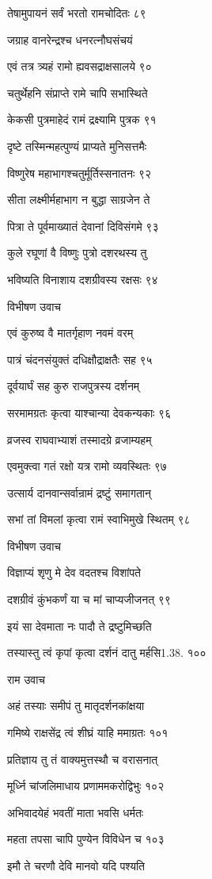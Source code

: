 तेषामुपायनं सर्वं भरतो रामचोदितः ८९

जग्राह वानरेन्द्रश्च धनरत्नौघसंचयं

एवं तत्र त्र्यहं रामो ह्यवसद्राक्षसालये ९०

चतुर्थेहनि संप्राप्ते रामे चापि सभास्थिते

केकसी पुत्रमाहेदं रामं द्रक्ष्यामि पुत्रक ९१

दृष्टे तस्मिन्महत्पुण्यं प्राप्यते मुनिसत्तमैः

विष्णुरेष महाभागश्चतुर्मूर्तिस्सनातनः ९२

सीता लक्ष्मीर्महाभाग न बुद्धा साग्रजेन ते

पित्रा ते पूर्वमाख्यातं देवानां दिविसंगमे ९३

कुले रघूणां वै विष्णुः पुत्रो दशरथस्य तु

भविष्यति विनाशाय दशग्रीवस्य रक्षसः ९४

विभीषण उवाच

एवं कुरुष्व वै मातर्गृहाण नवमं वरम्

पात्रं चंदनसंयुक्तं दधिक्षौद्राक्षतैः सह ९५

दूर्वयार्घं सह कुरु राजपुत्रस्य दर्शनम्

सरमामग्रतः कृत्वा याश्चान्या देवकन्यकाः ९६

व्रजस्व राघवाभ्याशं तस्मादग्रे व्रजाम्यहम्

एवमुक्त्वा गतं रक्षो यत्र रामो व्यवस्थितः ९७

उत्सार्य दानवान्सर्वान्रामं द्रष्टुं समागतान्

सभां तां विमलां कृत्वा रामं स्वाभिमुखे स्थितम् ९८

विभीषण उवाच

विज्ञाप्यं शृणु मे देव वदतश्च विशांपते

दशग्रीवं कुंभकर्णं या च मां चाप्यजीजनत् ९९

इयं सा देवमाता नः पादौ ते द्रष्टुमिच्छति

तस्यास्तु त्वं कृपां कृत्वा दर्शनं दातु मर्हसि1.38. १००

राम उवाच

अहं तस्याः समीपं तु मातृदर्शनकांक्षया

गमिष्ये राक्षसेंद्र त्वं शीघ्रं याहि ममाग्रतः १०१

प्रतिज्ञाय तु तं वाक्यमुत्तस्थौ च वरासनात्

मूर्ध्नि चांजलिमाधाय प्रणाममकरोद्विभुः १०२

अभिवादयेहं भवतीं माता भवसि धर्मतः

महता तपसा चापि पुण्येन विविधेन च १०३

इमौ ते चरणौ देवि मानवो यदि पश्यति

